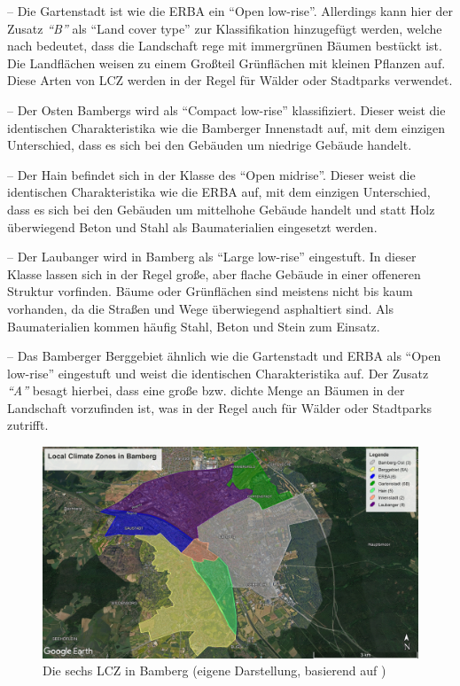  -- Die Gartenstadt ist wie die ERBA ein \enquote{Open low-rise}. Allerdings kann hier der Zusatz \textit{\enquote{B}} als \enquote{Land cover type} zur Klassifikation hinzugefügt werden, welche nach \cite{stewart2012local} bedeutet, dass die Landschaft rege mit immergrünen Bäumen bestückt ist. Die Landflächen weisen zu einem Großteil Grünflächen mit kleinen Pflanzen auf. Diese Arten von \ac{LCZ} werden in der Regel für Wälder oder Stadtparks verwendet.

 -- Der Osten Bambergs wird als \enquote{Compact low-rise} klassifiziert. Dieser weist die identischen Charakteristika wie die Bamberger Innenstadt auf, mit dem einzigen Unterschied, dass es sich bei den Gebäuden um niedrige Gebäude handelt.

 -- Der Hain befindet sich in der Klasse des \enquote{Open midrise}. Dieser weist die identischen Charakteristika wie die ERBA auf, mit dem einzigen Unterschied, dass es sich bei den Gebäuden um mittelhohe Gebäude handelt und statt Holz überwiegend Beton und Stahl als Baumaterialien eingesetzt werden.

 -- Der Laubanger wird in Bamberg als \enquote{Large low-rise} eingestuft. In dieser Klasse lassen sich in der Regel große, aber flache Gebäude in einer offeneren Struktur vorfinden. Bäume oder Grünflächen sind meistens nicht bis kaum vorhanden, da die Straßen und Wege überwiegend asphaltiert sind. Als Baumaterialien kommen häufig Stahl, Beton und Stein zum Einsatz.

 -- Das Bamberger Berggebiet ähnlich wie die Gartenstadt und ERBA als \enquote{Open low-rise} eingestuft und weist die identischen Charakteristika auf. Der Zusatz \textit{\enquote{A}} besagt hierbei, dass eine große bzw. dichte Menge an Bäumen in der Landschaft vorzufinden ist, was in der Regel auch für Wälder oder Stadtparks zutrifft.

\begin{figure}[t] %
    \centering
    \includegraphics[width=1\textwidth]{figures/lcz.jpg}
    \decoRule
    \caption[LCZ in Bamberg]{Die sechs \ac{LCZ} in Bamberg (eigene Darstellung, basierend auf \cite{stewart2012local,oke2004initial})}
    \label{fig:lcz}
\end{figure}

